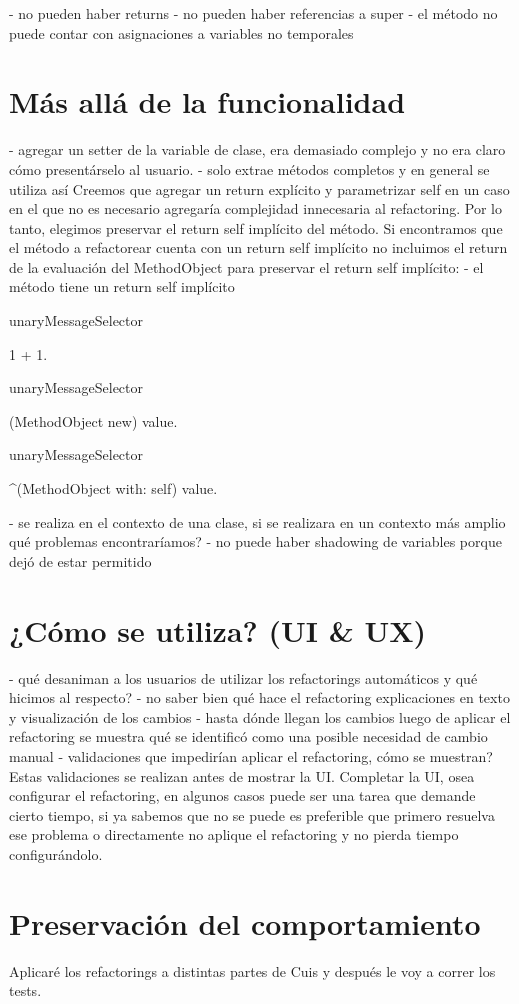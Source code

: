 

- no pueden haber returns
- no pueden haber referencias a super
- el método no puede contar con asignaciones a variables no temporales

\section{Más allá de la funcionalidad}
- agregar un setter de la variable de clase, era demasiado complejo y no era claro cómo presentárselo al usuario.
- solo extrae métodos completos y en general se utiliza así
Creemos que agregar un return explícito y parametrizar self en un caso en el que no es necesario
agregaría complejidad innecesaria al refactoring. Por lo tanto, elegimos preservar el return self
implícito del método. Si encontramos que el método a refactorear cuenta con un return self implícito
no incluimos el return de la evaluación del MethodObject para preservar el return self implícito:
- el método tiene un return self implícito

\begin{code}

unaryMessageSelector

 1 + 1.

unaryMessageSelector
 
 (MethodObject new) value.

unaryMessageSelector

 ^(MethodObject with: self) value.

\end{code}

- se realiza en el contexto de una clase, si se realizara en un contexto más amplio qué problemas encontraríamos?
- no puede haber shadowing de variables porque dejó de estar permitido

\section{¿Cómo se utiliza? (UI \& UX)}
- qué desaniman a los usuarios de utilizar los refactorings automáticos y qué hicimos al respecto?
    - no saber bien qué hace el refactoring
    explicaciones en texto y visualización de los cambios
    - hasta dónde llegan los cambios
    luego de aplicar el refactoring se muestra qué se identificó como una posible necesidad de cambio manual
- validaciones que impedirían aplicar el refactoring, cómo se muestran? Estas validaciones se
realizan antes de mostrar la UI. Completar la UI, osea configurar el refactoring, en algunos
casos puede ser una tarea que demande cierto tiempo, si ya sabemos que no se puede es preferible
que primero resuelva ese problema o directamente no aplique el refactoring y no pierda tiempo
configurándolo.


\section{Preservación del comportamiento}
Aplicaré los refactorings a distintas partes de Cuis y después le voy a correr los tests.